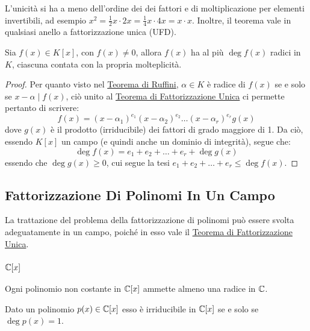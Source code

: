 \documentclass[11pt]{scrartcl}
\begin{document}
\begin{remark}
L'unicità si ha a meno dell'ordine dei dei fattori e di moltiplicazione per elementi invertibili, ad esempio $x^2 = \frac 12x \cdot 2x = \frac 14x \cdot 4x  = x \cdot x$. Inoltre, il teorema vale in qualsiasi anello a fattorizzazione unica (UFD).
\end{remark}


\begin{corollary}
	\label{p:3.20}
Sia $f(x) \in K[x]$, con $f(x) \ne 0$, allora $f(x)$ ha al più $\deg f(x)$ radici in $K$, ciascuna contata con la propria molteplicità.
\end{corollary}

\begin{proof}
Per quanto visto nel \hyperref[p:ruffini]{Teorema di Ruffini}, $\alpha \in K$ è radice di $f(x)$ se e solo se $x-\alpha \mid f(x)$, ciò unito al \hyperref[p:fac]{Teorema di Fattorizzazione Unica} ci permette pertanto di scrivere:
	\[ f(x) = (x - \alpha_1)^{e_1}(x - \alpha_2)^{e_2}\ldots (x - \alpha_r)^{e_r}g(x)
	\]
dove $g(x)$ è il prodotto (irriducibile) dei fattori di grado maggiore di 1. Da ciò, essendo $K[x]$ un campo (e quindi anche un dominio di integrità), segue che:
	\[ \deg f(x) = e_1 + e_2 + \ldots + e_r + \deg g(x)
	\]
	essendo che $\deg g(x) \geq 0$, cui segue la tesi $e_1 + e_2 + \ldots + e_r \leq \deg f(x)$.
\end{proof}

\newpage
\subsection{Fattorizzazione Di Polinomi In Un Campo}
La trattazione del problema della fattorizzazione di polinomi può essere svolta adeguatamente in un campo, poiché in esso vale il \hyperref[p:fac]{Teorema di Fattorizzazione Unica}.

\subsubsection{$\mathbb C[x]$}
\begin{theorem}
\label{p:tf}
Ogni polinomio non costante in $\mathbb C[x]$ ammette almeno una radice in $\mathbb C$.
\end{theorem}

\begin{corollary}
\label{p:3.21}
Dato un polinomio $p(x) \in \mathbb C[x]$ esso è irriducibile in $\mathbb C[x]$ se e solo se $\deg p(x) = 1$.
\end{corollary}
\end{document}
